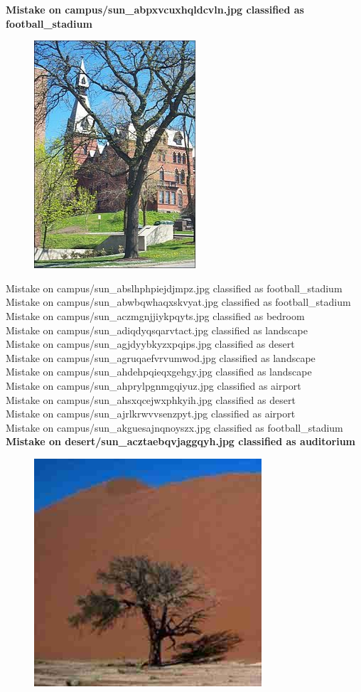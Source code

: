 \documentclass[12pt]{article}
\begin{document}
{\bf Mistake on campus/sun\_abpxvcuxhqldcvln.jpg classified as football\_stadium \\}
\begin{figure}
\centering
\includegraphics[width=0.5\linewidth]{../dat/campus/sun_abpxvcuxhqldcvln.jpg}
\end{figure}
Mistake on campus/sun\_abslhphpiejdjmpz.jpg classified as football\_stadium \\
Mistake on campus/sun\_abwbqwhaqxskvyat.jpg classified as football\_stadium \\
Mistake on campus/sun\_aczmgnjjiykpqyts.jpg classified as bedroom \\
Mistake on campus/sun\_adiqdyqsqarvtact.jpg classified as landscape \\
Mistake on campus/sun\_agjdyybkyzxpqips.jpg classified as desert \\
Mistake on campus/sun\_agruqaefvrvumwod.jpg classified as landscape \\
Mistake on campus/sun\_ahdehpqieqxgehgy.jpg classified as landscape \\
Mistake on campus/sun\_ahprylpgnmgqiyuz.jpg classified as airport \\
Mistake on campus/sun\_ahsxqcejwxphkyih.jpg classified as desert \\
Mistake on campus/sun\_ajrlkrwvvsenzpyt.jpg classified as airport \\
Mistake on campus/sun\_akguesajnqnoyszx.jpg classified as football\_stadium \\
{\bf Mistake on desert/sun\_acztaebqvjaggqyh.jpg classified as auditorium \\}
\begin{figure}
\centering
\includegraphics[width=0.5\linewidth]{../dat/desert/sun_acztaebqvjaggqyh.jpg}
\end{figure}
\end{document}
